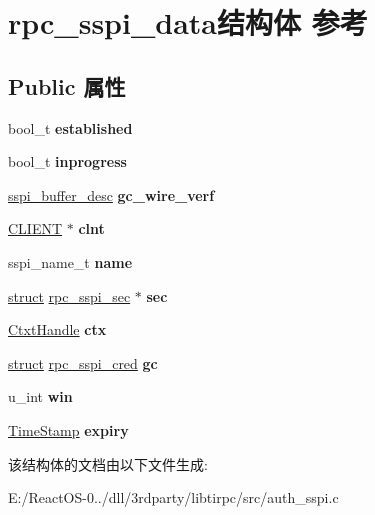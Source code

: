 \hypertarget{structrpc__sspi__data}{}\section{rpc\+\_\+sspi\+\_\+data结构体 参考}
\label{structrpc__sspi__data}
\subsection*{Public 属性}
\begin{DoxyCompactItemize}
\item 
\mbox{\label{structrpc__sspi__data_a76f43333fcd5522a7cd1739fe24d318c}} 
bool\+\_\+t {\bfseries established}
\item 
\mbox{\label{structrpc__sspi__data_ab986af1913298aaa7cc6a8f8b46cecd8}} 
bool\+\_\+t {\bfseries inprogress}
\item 
\mbox{\label{structrpc__sspi__data_a4dedc3d22c8be7ef8db6d2f98556fb6f}} 
\hyperlink{struct__sspi__buffer__desc}{sspi\+\_\+buffer\+\_\+desc} {\bfseries gc\+\_\+wire\+\_\+verf}
\item 
\mbox{\label{structrpc__sspi__data_ad84a7d416315e73a930a25afb10fece2}} 
\hyperlink{struct____rpc__client}{C\+L\+I\+E\+NT} $\ast$ {\bfseries clnt}
\item 
\mbox{\label{structrpc__sspi__data_a27502f03fd45574be2a360bf4d7618b1}} 
sspi\+\_\+name\+\_\+t {\bfseries name}
\item 
\mbox{\label{structrpc__sspi__data_a5ce354359c42f742433f5184ca60aa38}} 
\hyperlink{interfacestruct}{struct} \hyperlink{structrpc__sspi__sec}{rpc\+\_\+sspi\+\_\+sec} $\ast$ {\bfseries sec}
\item 
\mbox{\label{structrpc__sspi__data_ae27bdc340baf3b630d612b90106a4e4e}} 
\hyperlink{struct___sec_handle}{Ctxt\+Handle} {\bfseries ctx}
\item 
\mbox{\label{structrpc__sspi__data_a3c93e0228ff0e886ac11a535060a9279}} 
\hyperlink{interfacestruct}{struct} \hyperlink{structrpc__sspi__cred}{rpc\+\_\+sspi\+\_\+cred} {\bfseries gc}
\item 
\mbox{\label{structrpc__sspi__data_ae8e1288ccce7620e2f748604e07b4cfd}} 
u\+\_\+int {\bfseries win}
\item 
\mbox{\label{structrpc__sspi__data_a40c05cd48149ce379ec17f125d20319a}} 
\hyperlink{struct___s_e_c_u_r_i_t_y___i_n_t_e_g_e_r}{Time\+Stamp} {\bfseries expiry}
\end{DoxyCompactItemize}


该结构体的文档由以下文件生成\+:\begin{DoxyCompactItemize}
\item 
E\+:/\+React\+O\+S-\/0../dll/3rdparty/libtirpc/src/auth\+\_\+sspi.\+c\end{DoxyCompactItemize}

